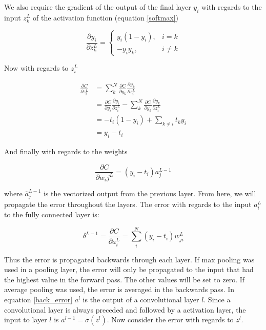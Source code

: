 \documentclass[english, a4paper]{article}
\begin{document}
We also require the gradient of the output of the final layer $y_i$ with regards to the input $z_k^L$ of the activation function (equation \ref{softmax})

\begin{equation}
  \frac{\partial y_i}{\partial z_k^L} = 
  \begin{cases}
      y_i(1 - y_i), & i = k\\
      -y_iy_k, & i \ne k
  \end{cases}
\end{equation}

Now with regards to $z_i^L$

\begin{equation}
  \begin{aligned}
  \frac{\partial C}{\partial z_i^L} &= \sum_k^N \frac{\partial C}{\partial y_k}\frac{\partial y_k}{\partial z_i^L} \\
  &= \frac{\partial C}{\partial y_i}\frac{\partial y_i}{\partial z_i^L} - \sum_k^N \frac{\partial C}{\partial y_k}\frac{\partial y_k}{\partial z_i^L} \\
  &= -t_i(1 - y_i) + \sum_{k \ne i}t_ky_i \\
  &= y_i - t_i
  \end{aligned}
\end{equation}

And finally with regards to the weights

\begin{equation}
   \frac{\partial C}{\partial w_ij^L} = (y_i - t_i)a_j^{L-1}
\end{equation}

where $\hat{a}_{j}^{L-1}$ is the vectorized output from the previous layer. From here, we will propagate the error throughout the layers. The error with regards to the input $a_i^L$ to the fully connected layer is:

\begin{equation} %
  \delta^{L-1} = \frac{\partial C}{\partial a_i^L} = \sum_i^N (y_i - t_i)w_{ji}^{L}
  \label{back_error}
\end{equation}

Thus the error is propagated backwards through each layer. If max pooling was used in a pooling layer, the error will only be propagated to the input that had the highest value in the forward pass. The other values will be set to zero. If average pooling was used, the error is averaged in the backwards pass.
In equation \ref{back_error} $a^l$ is the output of a convolutional layer $l$. Since a convolutional layer is always preceded and followed by a activation layer, the input to layer $l$ is $a^{l-1} = \sigma(z^l)$. Now consider the error with regards to $z^l$.
\end{document}
